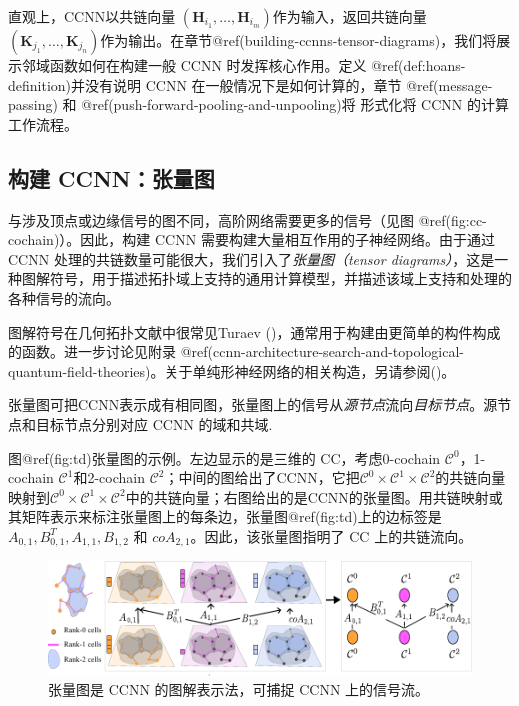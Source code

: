 \documentclass[
  12pt,
]{krantz}
\begin{document}
直观上，CCNN以共链向量
\((\mathbf{H}_{i_1},\ldots, \mathbf{H}_{i_m})\)作为输入，返回共链向量\((\mathbf{K}_{j_1},\ldots, \mathbf{K}_{j_n})\)作为输出。在章节@ref(building-ccnns-tensor-diagrams)，我们将展示邻域函数如何在构建一般
CCNN 时发挥核心作用。定义 @ref(def:hoans-definition)并没有说明 CCNN
在一般情况下是如何计算的，章节 @ref(message-passing) 和
@ref(push-forward-pooling-and-unpooling)将 形式化将 CCNN
的计算工作流程。

\subsection{构建 CCNN：张量图}\label{building-ccnns-tensor-diagrams}

与涉及顶点或边缘信号的图不同，高阶网络需要更多的信号（见图
@ref(fig:cc-cochain)）。因此，构建 CCNN
需要构建大量相互作用的子神经网络。由于通过 CCNN
处理的共链数量可能很大，我们引入了\emph{张量图（tensor
diagrams）}，这是一种图解符号，用于描述拓扑域上支持的通用计算模型，并描述该域上支持和处理的各种信号的流向。

图解符号在几何拓扑文献中很常见Turaev
()，通常用于构建由更简单的构件构成的函数。进一步讨论见附录
@ref(ccnn-architecture-search-and-topological-quantum-field-theories)。关于单纯形神经网络的相关构造，另请参阅()。

\label{tdd}
张量图可把CCNN表示成有相同图，张量图上的信号从\emph{源节点}流向\emph{目标节点}。源节点和目标节点分别对应
CCNN 的域和共域.

图@ref(fig:td)张量图的示例。左边显示的是三维的 CC，考虑0-cochain
\(\mathcal{C}^0\)，1-cochain \(\mathcal{C}^1\)和2-cochain
\(\mathcal{C}^2\)；中间的图给出了CCNN，它把\(\mathcal{C}^0 \times \mathcal{C}^1\times \mathcal{C}^2\)的共链向量映射到\(\mathcal{C}^0\times\mathcal{C}^1 \times \mathcal{C}^2\)中的共链向量；右图给出的是CCNN的张量图。用共链映射或其矩阵表示来标注张量图上的每条边，张量图@ref(fig:td)上的边标签是\(A_{0,1}, B_{0,1}^{T}, A_{1,1}, B_{1,2}\)
和 \(coA_{2,1}\)。因此，该张量图指明了 CC 上的共链流向。

\begin{figure}

{\centering \includegraphics{figures/tensor_diagram} 

}

\caption{张量图是 CCNN 的图解表示法，可捕捉 CCNN 上的信号流。}\label{fig:td}
\end{figure}
\end{document}
